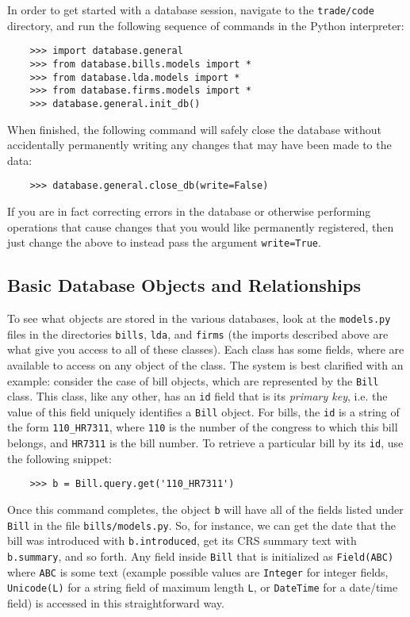 \documentclass[11pt,letterpaper]{article}
\theoremstyle{plain}
\begin{document}
In order to get started with a database session, navigate to the
\texttt{trade/code} directory, and run the following sequence of
commands in the Python interpreter:
\begin{verbatim}
    >>> import database.general
    >>> from database.bills.models import *
    >>> from database.lda.models import *
    >>> from database.firms.models import *
    >>> database.general.init_db()
\end{verbatim}
When finished, the following command will safely close the database
without accidentally permanently writing any changes that may have
been made to the data:
\begin{verbatim}
    >>> database.general.close_db(write=False)
\end{verbatim}
If you are in fact correcting errors in the database or otherwise
performing operations that cause changes that you would like
permanently registered, then just change the above to instead pass the
argument \texttt{write=True}.

\subsection{Basic Database Objects and Relationships}

To see what objects are stored in the various databases, look at the
\texttt{models.py} files in the directories \texttt{bills},
\texttt{lda}, and \texttt{firms} (the imports described above are what
give you access to all of these classes).  Each class has some fields,
where are available to access on any object of the class.  The system
is best clarified with an example: consider the case of bill objects,
which are represented by the \texttt{Bill} class.  This class, like
any other, has an \texttt{id} field that is its \emph{primary key},
i.e. the value of this field uniquely identifies a \texttt{Bill}
object.  For bills, the \texttt{id} is a string of the form
\texttt{110\_HR7311}, where \texttt{110} is the number of the congress
to which this bill belongs, and \texttt{HR7311} is the bill number.
To retrieve a particular bill by its \texttt{id}, use the following
snippet:
\begin{verbatim}
    >>> b = Bill.query.get('110_HR7311')
\end{verbatim}
Once this command completes, the object \texttt{b} will have all of
the fields listed under \texttt{Bill} in the file
\texttt{bills/models.py}.  So, for instance, we can get the date that
the bill was introduced with \texttt{b.introduced}, get its CRS
summary text with \texttt{b.summary}, and so forth.  Any field inside
\texttt{Bill} that is initialized as \texttt{Field(ABC)} where
\texttt{ABC} is some text (example possible values are
\texttt{Integer} for integer fields, \texttt{Unicode(L)} for a string
field of maximum length \texttt{L}, or \texttt{DateTime} for a
date/time field) is accessed in this straightforward way.
\end{document}
